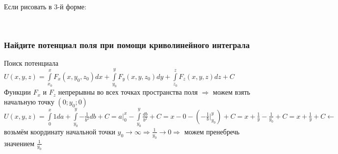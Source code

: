 \documentclass{article}
\begin{document}
                \begin{figure}[h!]
                \end{figure}
                \newpage
                Если рисовать в 3-й форме:\\
                \begin{figure}[h!]
                \end{figure}\\
                \subsubsection{Найдите потенциал поля при помощи криволинейного интеграла}
                Поиск потенциала\\
                $U(x, y, z) = \int\limits^x_{x_0}{F_x(x, y_0, z_0)dx} + \int\limits^y_{y_0}{F_y(x, y, z_0)dy} + \int\limits^z_{z_0}{F_z(x, y, z)dz} + C$\\
                Функции $F_x$ и $F_z$ непрерывны во всех точках пространства поля $\Rightarrow$ можем взять начальную точку $(0; y_0; 0)$\\
                $U(x, y, z) = \int\limits^x_0{1da} + \int\limits^y_{y_0}{-\frac{1}{b^2}db} + C = a |^x_0 - \int\limits^y_{y_0}{\frac{db}{b^2}} + C = x - 0 - (-\frac{1}{b} |^y_{y_0}) + C = x + \frac{1}{y} - \frac{1}{y_0} + C = x + \frac{1}{y} + C \leftarrow$ возьмём координату начальной точки $y_0 \rightarrow \infty \Rightarrow \frac{1}{y_0} \rightarrow 0 \Rightarrow$ можем пренебречь значением $\frac{1}{y_0}$\\\\
\end{document}
